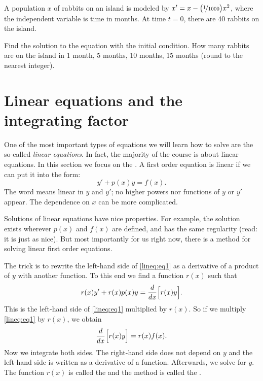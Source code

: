 \begin{exercise}
A population $x$ of rabbits on an island is modeled by
$x' = x- \bigl(\nicefrac{1}{1000} \bigr) x^2$, where the independent
variable is time in months.  At time $t=0$, there are 40 rabbits
on the island.
\begin{tasks}
\task Find the solution to the equation with the initial
condition.
\task
How many rabbits are on the island in 1 month, 5 months, 
10 months, 15 months (round to the nearest integer).
\end{tasks}
\end{exercise}


\sectionnewpage
\section{Linear equations and the integrating factor}
\label{intfactor:section}


One of the most important types of equations we will learn how to solve are
the so-called
\emph{linear equations}.
In fact, the majority of the course is about linear
equations.  In this section we focus on the
\emph{}.
A first order equation is linear if we can put it
into the form:
\begin{equation} \label{lineq:eq1}
y' + p(x) y = f(x) .
\end{equation}
The word
 means linear in $y$ and $y'$;
no higher powers nor functions of $y$ or $y'$ appear.
The dependence on $x$ can be more
complicated.

Solutions of linear equations have nice properties.  For example, the
solution exists wherever $p(x)$ and $f(x)$ are defined, and has the same
regularity (read: it is just as nice).  But most importantly for us right now,
there is a method for solving linear first order equations.

The trick is to rewrite the left-hand side
of \eqref{lineq:eq1} as a derivative of a product of $y$ with another
function.
To this end
we find a function $r(x)$ such that
\begin{equation*}
r(x) y' + r(x) p(x) y = \frac{d}{dx}\Bigl[ r(x) y \Bigr] .
\end{equation*}
This is the left-hand side of
\eqref{lineq:eq1} multiplied by $r(x)$.  So if we multiply \eqref{lineq:eq1} by
$r(x)$, we obtain
\begin{equation*}
\frac{d}{dx}\Bigl[ r(x) y \Bigr] = r(x)f(x) .
\end{equation*}
Now we integrate both sides.
The right-hand side does not depend on $y$ and the left-hand side
is written as a derivative of a function.  Afterwards, we solve for $y$.
The function $r(x)$ is called the \emph{} and the
method is called the \emph{}.

